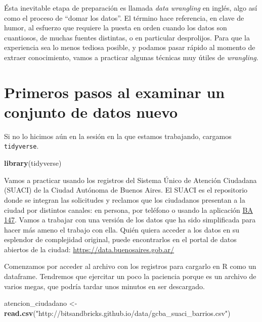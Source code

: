\documentclass[]{book}
\newenvironment{Shaded}{\begin{snugshade}}{\end{snugshade}}
\newcommand{\KeywordTok}[1]{\textcolor[rgb]{0.13,0.29,0.53}{\textbf{#1}}}
\newcommand{\StringTok}[1]{\textcolor[rgb]{0.31,0.60,0.02}{#1}}
\newcommand{\NormalTok}[1]{#1}
\begin{document}
Ésta inevitable etapa de preparación es llamada \emph{data wrangling} en
inglés, algo así como el proceso de ``domar los datos''. El término hace
referencia, en clave de humor, al esfuerzo que requiere la puesta en
orden cuando los datos son cuantiosos, de muchas fuentes distintas, o en
particular desprolijos. Para que la experiencia sea lo menos tediosa
posible, y podamos pasar rápido al momento de extraer conocimiento,
vamos a practicar algunas técnicas muy útiles de \emph{wrangling}.

\section{Primeros pasos al examinar un conjunto de datos
nuevo}\label{primeros-pasos-al-examinar-un-conjunto-de-datos-nuevo}

Si no lo hicimos aún en la sesión en la que estamos trabajando, cargamos
\texttt{tidyverse}.

\begin{Shaded}
\begin{Highlighting}[]
\KeywordTok{library}\NormalTok{(tidyverse)}
\end{Highlighting}
\end{Shaded}

Vamos a practicar usando los registros del Sistema Único de Atención
Ciudadana (SUACI) de la Ciudad Autónoma de Buenos Aires. El SUACI es el
repositorio donde se integran las solicitudes y reclamos que los
ciudadanos presentan a la ciudad por distintos canales: en persona, por
teléfono o usando la aplicación
\href{https://gestioncolaborativa.buenosaires.gob.ar/prestaciones}{BA
147}. Vamos a trabajar con una versión de los datos que ha sido
simplificada para hacer más ameno el trabajo con ella. Quién quiera
acceder a los datos en su esplendor de complejidad original, puede
encontrarlos en el portal de datos abiertos de la ciudad:
\url{https://data.buenosaires.gob.ar/}

Comenzamos por acceder al archivo con los registros para cargarlo en R
como un dataframe. Tendremos que ejercitar un poco la paciencia porque
es un archivo de varios megas, que podría tardar unos minutos en ser
descargado.

\begin{Shaded}
\begin{Highlighting}[]
\NormalTok{atencion_ciudadano <-}\StringTok{ }\KeywordTok{read.csv}\NormalTok{(}\StringTok{"http://bitsandbricks.github.io/data/gcba_suaci_barrios.csv"}\NormalTok{)}
\end{Highlighting}
\end{Shaded}
\end{document}
